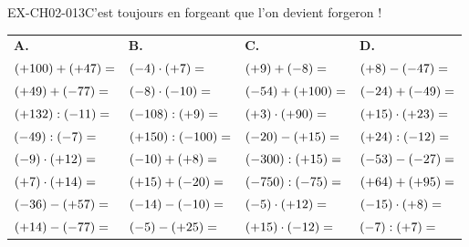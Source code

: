 \begin{exercice}{EX-CH02-013}{C'est toujours en forgeant que l'on devient forgeron !}

{\small
\bigskip
\def\arraystretch{1.25}
\begin{tabularx}{\linewidth}{*{4}{X}}
\textbf{A.} & \textbf{B.} & \textbf{C.} & \textbf{D.} \\
$(+100)+(+47)= \dotfill$ & $(-4)\cdot(+7)= \dotfill$    & $(+9)+(-8)= \dotfill$      & $(+8)-(-47)= \dotfill$      \\
$(+49)+(-77)= \dotfill$  & $(-8)\cdot(-10)= \dotfill$   & $(-54)+(+100)= \dotfill$   & $(-24)+(-49)= \dotfill$     \\
$(+132):(-11)= \dotfill$ & $(-108):(+9)= \dotfill$      & $(+3)\cdot(+90)= \dotfill$ & $(+15)\cdot(+23)= \dotfill$ \\
$(-49):(-7)= \dotfill$   & $(+150):(-100)= \dotfill$    & $(-20)-(+15)= \dotfill$    & $(+24):(-12)= \dotfill$     \\
$(-9)\cdot(+12)= \dotfill$ & $(-10)+(+8)= \dotfill$     & $(-300):(+15)= \dotfill$   & $(-53)-(-27)= \dotfill$     \\
$(+7)\cdot(+14)= \dotfill$ & $(+15)+(-20)= \dotfill$    & $(-750):(-75)= \dotfill$   & $(+64)+(+95)= \dotfill$     \\
$(-36)-(+57)= \dotfill$  & $(-14)-(-10)= \dotfill$      & $(-5)\cdot(+12)= \dotfill$ & $(-15)\cdot(+8)= \dotfill$  \\
$(+14)-(-77)= \dotfill$  & $(-5)-(+25)= \dotfill$       & $(+15)\cdot(-12)= \dotfill$& $(-7):(+7)= \dotfill$       \\
\end{tabularx}

}
\end{exercice}
